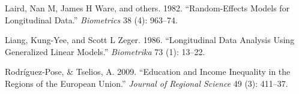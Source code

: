 \documentclass[
]{article}
\begin{document}
\leavevmode\hypertarget{ref-laird1982random}{}%
Laird, Nan M, James H Ware, and others. 1982. ``Random-Effects Models
for Longitudinal Data.'' \emph{Biometrics} 38 (4): 963--74.

\leavevmode\hypertarget{ref-liang1986longitudinal}{}%
Liang, Kung-Yee, and Scott L Zeger. 1986. ``Longitudinal Data Analysis
Using Generalized Linear Models.'' \emph{Biometrika} 73 (1): 13--22.

\leavevmode\hypertarget{ref-rodriguez2009}{}%
Rodríguez‐Pose, \& Tselios, A. 2009. ``Education and Income Inequality
in the Regions of the European Union.'' \emph{Journal of Regional
Science} 49 (3): 411--37.
\end{document}
